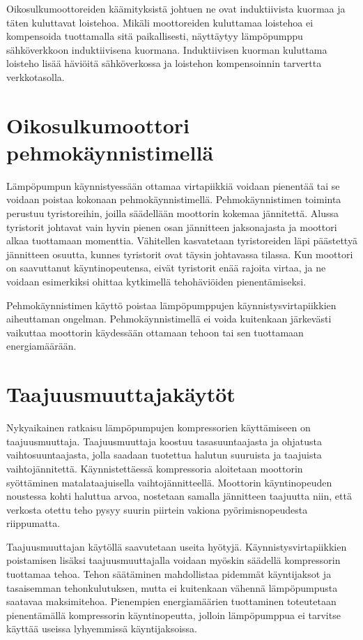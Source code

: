  Oikosulkumoottoreiden käämityksistä johtuen ne ovat induktiivista kuormaa ja täten kuluttavat loistehoa. Mikäli moottoreiden kuluttamaa loistehoa ei kompensoida tuottamalla sitä paikallisesti, näyttäytyy lämpöpumppu sähköverkkoon induktiivisena kuormana. Induktiivisen kuorman kuluttama loisteho lisää häviöitä sähköverkossa ja loistehon kompensoinnin tarvertta verkkotasolla.\parencite{pakonen} 


\section{Oikosulkumoottori pehmokäynnistimellä}
  Lämpöpumpun käynnistyessään ottamaa virtapiikkiä voidaan pienentää tai se voidaan poistaa kokonaan pehmokäynnistimellä. Pehmokäynnistimen toiminta perustuu tyristoreihin, joilla säädellään moottorin kokemaa jännitettä. Alussa tyristorit johtavat vain hyvin pienen osan jännitteen jaksonajasta ja moottori alkaa tuottamaan momenttia. Vähitellen kasvatetaan tyristoreiden läpi päästettyä jännitteen osuutta, kunnes tyristorit ovat täysin johtavassa tilassa. Kun moottori on saavuttanut käyntinopeutensa, eivät tyristorit enää rajoita virtaa, ja ne voidaan esimerkiksi ohittaa kytkimellä tehohäviöiden pienentämiseksi.\parencite{pehmokaynnistinopas}

  Pehmokäynnistimen käyttö poistaa lämpöpumppujen käynnistysvirtapiikkien aiheuttaman ongelman. Pehmokäynnistimellä ei voida kuitenkaan järkevästi vaikuttaa moottorin käydessään ottamaan tehoon tai sen tuottamaan energiamäärään.

\section{Taajuusmuuttajakäytöt}
  Nykyaikainen ratkaisu lämpöpumpujen kompressorien käyttämiseen on taajuusmuuttaja. Taajuusmuuttaja koostuu tasasuuntaajasta ja ohjatusta vaihtosuuntaajasta, jolla saadaan tuotettua halutun suuruista ja taajuista vaihtojännitettä. Käynnistettäessä kompressoria aloitetaan moottorin syöttäminen matalataajuisella vaihtojännitteellä. Moottorin käyntinopeuden noustessa kohti haluttua arvoa, nostetaan samalla jännitteen taajuutta niin, että verkosta otettu teho pysyy suurin piirtein vakiona pyörimisnopeudesta riippumatta.

  Taajuusmuuttajan käytöllä saavutetaan useita hyötyjä. Käynnistysvirtapiikkien poistamisen lisäksi taajuusmuuttajalla voidaan myöskin säädellä kompressorin tuottamaa tehoa. Tehon säätäminen mahdollistaa pidemmät käyntijaksot ja tasaisemman tehonkulutuksen, mutta ei kuitenkaan vähennä lämpöpumpusta saatavaa maksimitehoa. Pienempien energiamäärien tuottaminen toteutetaan pienentämällä kompressorin käyntinopeutta, jolloin lämpöpumppua ei tarvitse käyttää useissa lyhyemmissä käyntijaksoissa.

